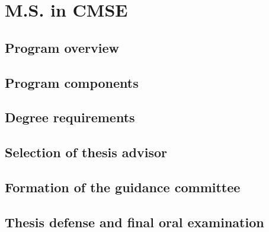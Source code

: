\section{M.S. in CMSE}
\label{sec:ms}

\subsection{Program overview}

\subsection{Program components}

\subsection{Degree requirements}

\subsection{Selection of thesis advisor}

\subsection{Formation of the guidance committee}

\subsection{Thesis defense and final oral examination}
